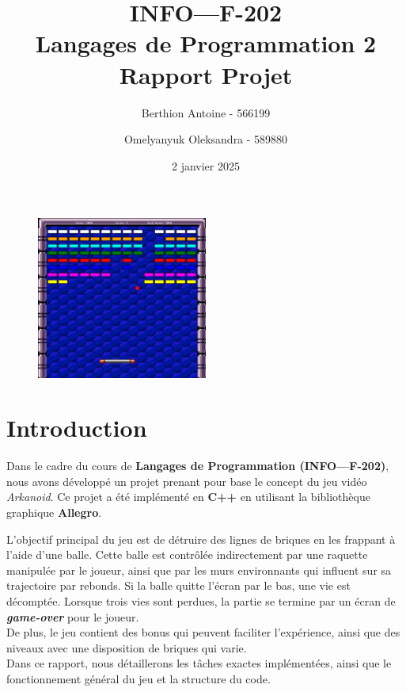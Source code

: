 \documentclass{article}
\title{\textbf{INFO—F-202} \\
Langages de Programmation 2 \\ 
Rapport Projet}
\author{Berthion Antoine - 566199 \and Omelyanyuk Oleksandra - 589880}
\date{2 janvier 2025}
\begin{document}
\maketitle

\vspace{-2.5em}

\begin{figure}[H]
    \centering
    \includegraphics[width=0.5\textwidth]{src/intro.png}
    \label{fig:intro}
\end{figure}

\section{Introduction}

\noindent Dans le cadre du cours de \textbf{Langages de Programmation (INFO—F-202)}, nous avons développé un projet prenant pour base le concept du jeu vidéo \textit{Arkanoid}. Ce projet a été implémenté en \textbf{C++} en utilisant la bibliothèque graphique \textbf{Allegro}. 

\noindent L’objectif principal du jeu est de détruire des lignes de briques en les frappant à l’aide d’une balle. Cette balle est contrôlée indirectement par une raquette manipulée par le joueur, ainsi que par les murs environnants qui influent sur sa trajectoire par rebonds. Si la balle quitte l’écran par le bas, une vie est décomptée. Lorsque trois vies sont perdues, la partie se termine par un écran de \textbf{\textit{game-over}} pour le joueur. \\

\noindent De plus, le jeu contient des bonus qui peuvent faciliter l’expérience, ainsi que des niveaux avec une disposition de briques qui varie. \\

\noindent Dans ce rapport, nous détaillerons les tâches exactes implémentées, ainsi que le fonctionnement général du jeu et la structure du code.
\end{document}

